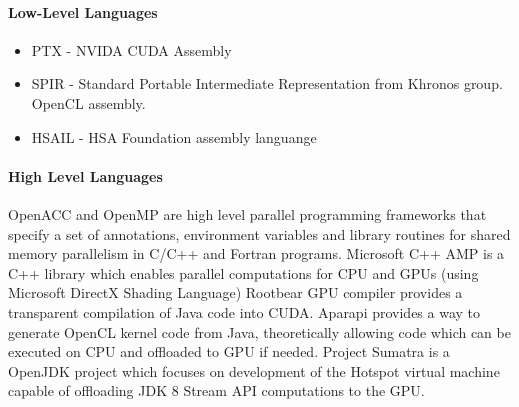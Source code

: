 \documentclass[]{report}
\begin{document}
\paragraph*{Low-Level Languages}
\begin{itemize}
\item PTX - NVIDA CUDA Assembly
\item SPIR - Standard Portable Intermediate Representation from Khronos group. OpenCL assembly.
\item HSAIL -  HSA Foundation assembly languange
\end{itemize}

\paragraph*{High Level Languages}

OpenACC and OpenMP are high level parallel programming frameworks that specify a set of annotations, environment variables and library routines for shared memory parallelism in C/C++ and Fortran programs\cite{OpenACC}\cite{OpenMP}.
Microsoft C++ AMP\cite{MSDN_AMP} is a C++ library which enables parallel computations for CPU and GPUs (using Microsoft DirectX Shading Language)
Rootbear GPU compiler provides a transparent compilation of Java code into CUDA\cite{Rootbear}.
Aparapi provides a way to generate OpenCL kernel code from Java, theoretically allowing code which can be executed on CPU and offloaded to GPU if needed\cite{Aparapi}.
Project Sumatra is a OpenJDK project which focuses on development of the Hotspot virtual machine capable of offloading JDK 8 Stream API\cite{StreamAPI} computations to the GPU\cite{Sumatra}.
\end{document}
